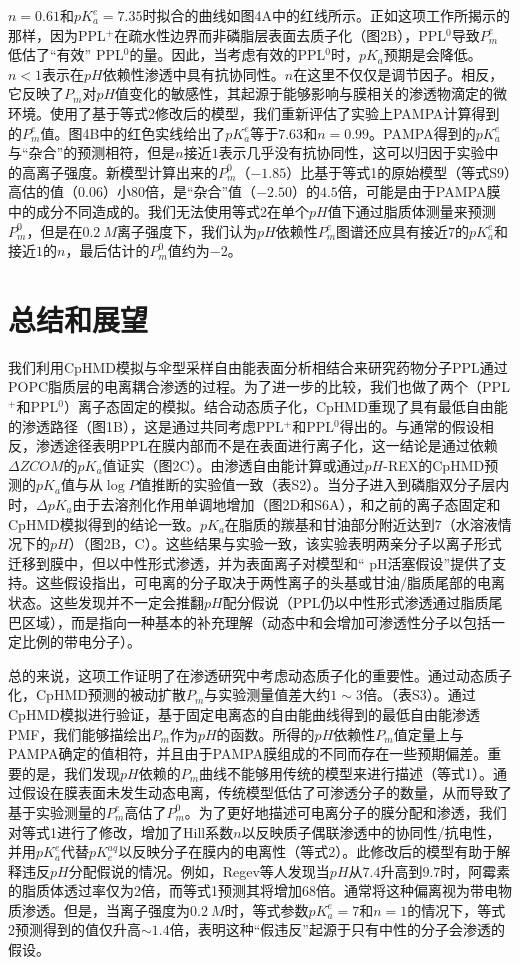 \documentclass[journal=,manuscript=artical,email=false]{achemso}
\begin{document}
$n=0.61$和$pK^e_a=7.35$时拟合的曲线如图4A中的红线所示。正如这项工作所揭示的那样，因为PPL$^{+}$在疏水性边界而非磷脂层表面去质子化（图2B），PPL$^{0}$导致$P^e_m$低估了“有效” PPL$^0$的量。因此，当考虑有效的PPL$^{0}$时，$pK_a$预期是会降低。$n <1$表示在$pH$依赖性渗透中具有抗协同性。$n$在这里不仅仅是调节因子。相反，它反映了$P_m$对$pH$值变化的敏感性，其起源于能够影响与膜相关的渗透物滴定的微环境。使用了基于等式2修改后的模型，我们重新评估了实验上PAMPA计算得到的$P^e_m$值。图4B中的红色实线给出了$pK^e_a$等于$7.63$和$n=0.99$。PAMPA得到的$pK^e_a$与“杂合”的预测相符，但是$n$接近$1$表示几乎没有抗协同性，这可以归因于实验中的高离子强度。新模型计算出来的$P^0_m$（$−1.85$）比基于等式1的原始模型（等式S9）高估的值（$0.06$）小$80$倍，是“杂合”值（$−2.50$）的$4.5$倍，可能是由于PAMPA膜中的成分不同造成的。我们无法使用等式2在单个$pH$值下通过脂质体测量来预测$P^0_m$，但是在$0.2~M$离子强度下，我们认为$pH$依赖性$P^e_m$图谱还应具有接近$7$的$pK^e_a$和接近$1$的$n$，最后估计的$P^0_m$值约为$-2$。


\section{总结和展望}
我们利用CpHMD模拟与伞型采样自由能表面分析相结合来研究药物分子PPL通过POPC脂质层的电离耦合渗透的过程。为了进一步的比较，我们也做了两个（PPL$^{+}$和PPL$^{0}$）离子态固定的模拟。结合动态质子化，CpHMD重现了具有最低自由能的渗透路径（图1B），这是通过共同考虑PPL$^{+}$和PPL$^{0}$得出的。与通常的假设相反，渗透途径表明PPL在膜内部而不是在表面进行离子化，这一结论是通过依赖$\Delta ZCOM$的$pK_a$值证实（图2C）。由渗透自由能计算或通过$pH$-REX的CpHMD预测的$pK_a$值与从$\log P$值推断的实验值一致（表S2）。当分子进入到磷脂双分子层内时，$\Delta pK_a$由于去溶剂化作用单调地增加（图2D和S6A），和之前的离子态固定和CpHMD模拟得到的结论一致。$pK_a$在脂质的羰基和甘油部分附近达到$7$（水溶液情况下的$pH$）（图2B，C）。这些结果与实验一致，该实验表明两亲分子以离子形式迁移到膜中，但以中性形式渗透，并为表面离子对模型和“ pH活塞假设”提供了支持。这些假设指出，可电离的分子取决于两性离子的头基或甘油/脂质尾部的电离状态。这些发现并不一定会推翻$pH$配分假说（PPL仍以中性形式渗透通过脂质尾巴区域），而是指向一种基本的补充理解（动态中和会增加可渗透性分子以包括一定比例的带电分子）。

总的来说，这项工作证明了在渗透研究中考虑动态质子化的重要性。通过动态质子化，CpHMD预测的被动扩散$P_m$与实验测量值差大约$1\sim 3$倍。（表S3）。通过CpHMD模拟进行验证，基于固定电离态的自由能曲线得到的最低自由能渗透PMF，我们能够描绘出$P_m$作为$pH$的函数。所得的$pH$依赖性$P_m$值定量上与PAMPA确定的值相符，并且由于PAMPA膜组成的不同而存在一些预期偏差。重要的是，我们发现$pH$依赖的$P_m$曲线不能够用传统的模型来进行描述（等式1）。通过假设在膜表面未发生动态电离，传统模型低估了可渗透分子的数量，从而导致了基于实验测量的$P^e_m$高估了$P^0_m$。为了更好地描述可电离分子的膜分配和渗透，我们对等式1进行了修改，增加了Hill系数$n$以反映质子偶联渗透中的协同性/抗电性，并用$pK^e_a$代替$pK^{aq}_e$以反映分子在膜内的电离性（等式2）。此修改后的模型有助于解释违反$pH$分配假说的情况。例如，Regev等人发现当$pH$从$7.4$升高到$9.7$时，阿霉素的脂质体透过率仅为$2$倍，而等式1预测其将增加68倍。通常将这种偏离视为带电物质渗透。但是，当离子强度为$0.2~M$时，等式参数$pK^e_a=7$和$n=1$的情况下，等式2预测得到的值仅升高$\sim 1.4$倍，表明这种“假违反”起源于只有中性的分子会渗透的假设。
\end{document}
